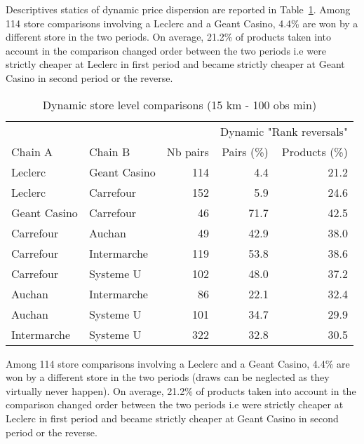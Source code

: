 \documentclass[english]{article}
\begin{document}
Descriptives statics of dynamic price dispersion are reported in Table~\ref{tab:dynamic_compa_15km}. Among 114 store comparisons involving a Leclerc and a Geant Casino, 4.4\% are won by a different store in the two periods. On average, 21.2\% of products taken into account in the comparison changed order between the two periods i.e were strictly cheaper at Leclerc in first period and became strictly cheaper at Geant Casino in second period or the reverse.

\begin{table}[H]
\begin{threeparttable}
\renewcommand{\arraystretch}{0.7}%
\caption{Dynamic store level comparisons (15 km - 100 obs min)}
\label{tab:dynamic_compa_15km}
\small
\begin{tabular}{llrrr}
\toprule
\toprule
    \textbf{} &       &       & \multicolumn{2}{c}{Dynamic "Rank reversals"} \\
    Chain A & Chain B & Nb pairs & Pairs (\%) & Products (\%) \\
\midrule
    Leclerc & Geant Casino & 114   & 4.4   & 21.2 \\
    Leclerc & Carrefour & 152   & 5.9   & 24.6 \\
    Geant Casino & Carrefour & 46    & 71.7  & 42.5 \\
    Carrefour & Auchan & 49    & 42.9  & 38.0 \\
    Carrefour & Intermarche & 119   & 53.8  & 38.6 \\
    Carrefour & Systeme U & 102   & 48.0  & 37.2 \\
    Auchan & Intermarche & 86    & 22.1  & 32.4 \\
    Auchan & Systeme U & 101   & 34.7  & 29.9 \\
    Intermarche & Systeme U & 322   & 32.8  & 30.5 \\
\bottomrule
\bottomrule
\end{tabular}
\begin{tablenotes}
      \small
      \item Among 114 store comparisons involving a Leclerc and a Geant Casino, 4.4\% are won by a different store in the two periods (draws can be neglected as they virtually never happen). On average, 21.2\% of products taken into account in the comparison changed order between the two periods i.e were strictly cheaper at Leclerc in first period and became strictly cheaper at Geant Casino in second period or the reverse.
\end{tablenotes}
\end{threeparttable}
\end{table}
 
\end{document}
